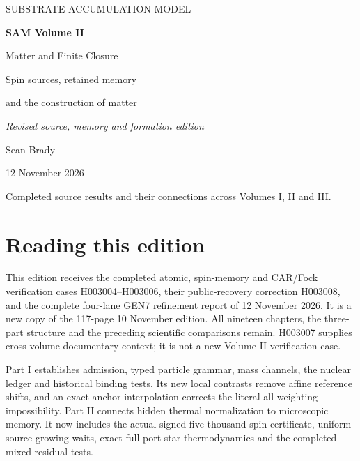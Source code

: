 
\newcommand{\VolumeRoman}{II}
\onecolumn\thispagestyle{empty}
\begin{center}\vspace*{0.8in}
{\small SUBSTRATE ACCUMULATION MODEL\par}\vspace{0.35in}
{\Huge\bfseries SAM Volume II\par}\vspace{0.15in}
{\LARGE Matter and Finite Closure\par}\vspace{0.25in}
{\large Spin sources, retained memory\par and the construction of matter\par\vspace{0.15in}\textit{Revised source, memory and formation edition}\par}\vspace{0.4in}
{\Large Sean Brady\par}\vspace{0.12in}
{\normalsize 12 November 2026\par}\end{center}
\vfill\noindent Completed source results and their connections across Volumes I, II and III.
\clearpage{}\tableofcontents
\clearpage{}\section*{Reading this edition}
This edition receives the completed atomic, spin-memory and CAR/Fock
verification cases H003004--H003006, their public-recovery correction
H003008, and the complete four-lane GEN7 refinement report of 12 November
2026. It is a new copy of the 117-page 10 November edition. All nineteen
chapters, the three-part structure and the preceding scientific comparisons
remain. H003007 supplies cross-volume documentary context; it is not a new
Volume II verification case.

Part I establishes admission, typed particle grammar, mass channels, the
nuclear ledger and historical binding tests. Its new local contrasts remove
affine reference shifts, and an exact anchor interpolation corrects the
literal all-weighting impossibility. Part II connects hidden thermal
normalization to microscopic memory. It now includes the actual signed
five-thousand-spin certificate, uniform-source growing waits, exact full-port
star thermodynamics and the completed mixed-residual tests.

